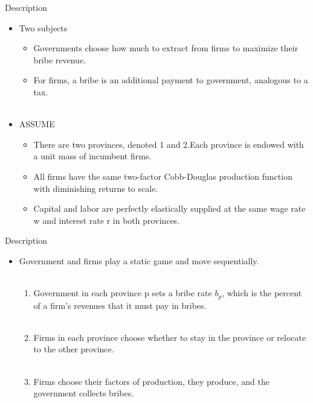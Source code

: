 \documentclass{beamer}
\begin{document}
\begin{frame}{Description}

\begin{itemize}
\item Two subjects
\begin{itemize}
\item Governments choose how much to extract from firms to maximize their bribe revenue.
\item For firms, a bribe is an additional payment to government, analogous to a tax.\\~
\end{itemize}

\item ASSUME 

\begin{itemize}
\item There are two provinces, denoted 1 and 2.Each province is endowed with a unit mass of incumbent firms.
\item All firms have the same two-factor Cobb-Douglas production function with diminishing returns to scale.
\item Capital and labor are perfectly elastically supplied at the same wage rate w and interest rate r in both provinces.
\end{itemize}

\end{itemize}

\end{frame}

\begin{frame}{Description}

\begin{itemize}
\item Government and firms play a static game and move sequentially.\\~
\begin{enumerate}
\item Government in each province p sets a bribe rate $b_p$, which is the percent of a firm's revenues that it must pay in bribes.\\~
\item Firms in each province choose whether to stay in the province or relocate to the other province.\\~
\item Firms choose their factors of production, they produce, and the government collects bribes.
\end{enumerate}

\end{itemize}

\end{frame}
\end{document}
